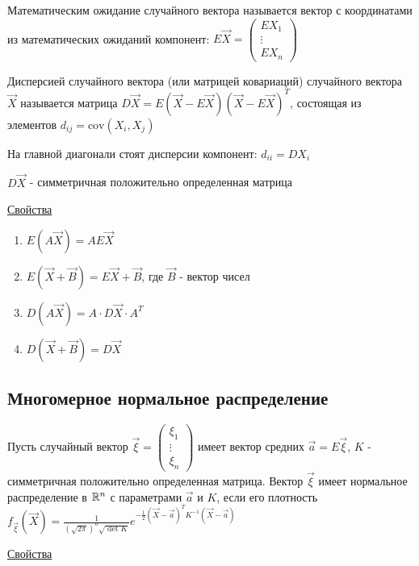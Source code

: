 \documentclass[12pt]{article}
\begin{document}
\Def Математическим ожидание случайного вектора называется вектор с координатами из математических ожиданий компонент: 
$E \vec X = \begin{pmatrix}E X_1 \\ \vdots \\ E X_n\end{pmatrix}$

\Def Дисперсией случайного вектора (или матрицей ковариаций) случайного вектора $\vec X$ называется
матрица $D \vec X = E (\vec X - E \vec X) (\vec X - E \vec X)^T$, состоящая из элементов $d_{ij} = \mathrm{cov} (X_i, X_j)$

\Notas На главной диагонали стоят дисперсии компонент: $d_{ii} = D X_i$

\Notas $D \vec X$ - симметричная положительно определенная матрица

\underline{Свойства}

\begin{enumerate}
    \item $E (A \vec X) = A E \vec X$

    \item $E (\vec X + \vec B) = E \vec X + \vec B$, где $\vec B$ - вектор чисел

    \item $D (A \vec X) = A \cdot D \vec X \cdot A^T$

    \item $D (\vec X + \vec B) = D \vec X$
\end{enumerate}

\subsection{Многомерное нормальное распределение}

\Def Пусть случайный вектор $\vec \xi = \begin{pmatrix}\xi_1 \\ \vdots \\ \xi_n\end{pmatrix}$ имеет вектор средних 
$\vec a = E \vec \xi$, $K$ - симметричная положительно определенная матрица. Вектор $\vec \xi$ 
имеет нормальное распределение в $\mathbb{R}^n$ с параметрами $\vec a$ и $K$, если его плотность 
$f_{\vec \xi} (\vec X) = \frac{1}{\left(\sqrt{2\pi}\right)^n \sqrt{\det K}} e^{-\frac{1}{2} (\vec X - \vec a)^T K^{-1} (\vec X - \vec a)}$


\underline{Свойства}
\end{document}
